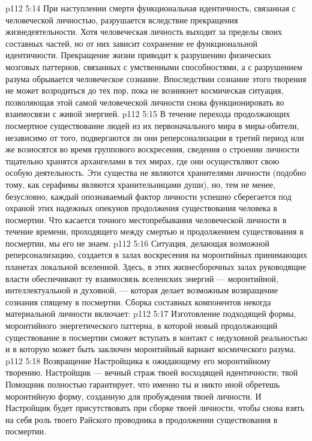 \vs p112 5:14 При наступлении смерти функциональная идентичность, связанная с человеческой личностью, разрушается вследствие прекращения жизнедеятельности. Хотя человеческая личность выходит за пределы своих составных частей, но от них зависит сохранение ее функциональной идентичности. Прекращение жизни приводит к разрушению физических мозговых паттернов, связанных с умственными способностями, а с разрушением разума обрывается человеческое сознание. Впоследствии сознание этого творения не может возродиться до тех пор, пока не возникнет космическая ситуация, позволяющая этой самой человеческой личности снова функционировать во взаимосвязи с живой энергией.
\vs p112 5:15 \pc В течение перехода продолжающих посмертное существование людей из их первоначального мира в миры\hyp{}обители, независимо от того, подвергаются ли они реперсонализации в третий период или же возносятся во время группового воскресения, сведения о строении личности тщательно хранятся архангелами в тех мирах, где они осуществляют свою особую деятельность. Эти существа не являются хранителями личности (подобно тому, как серафимы являются хранительницами души), но, тем не менее, безусловно, каждый опознаваемый фактор личности успешно сберегается под охраной этих надежных опекунов продолжения существования человека в посмертии. Что касается точного местопребывания человеческой личности в течение времени, проходящего между смертью и продолжением существования в посмертии, мы его не знаем.
\vs p112 5:16 \pc Ситуация, делающая возможной реперсонализацию, создается в залах воскресения на моронтийных принимающих планетах локальной вселенной. Здесь, в этих жизнесборочных залах руководящие власти обеспечивают ту взаимосвязь вселенских энергий --- моронтийной, интеллектуальной и духовной, --- которая делает возможным возвращение сознания спящему в посмертии. Сборка составных компонентов некогда материальной личности включает:
\vs p112 5:17 \bibnobreakspace Изготовление подходящей формы, моронтийного энергетического паттерна, в которой новый продолжающий существование в посмертии сможет вступать в контакт с недуховной реальностью и в которую может быть заключен моронтийный вариант космического разума.
\vs p112 5:18 \pc {}\bibnobreakspace Возвращение Настройщика к ожидающему его моронтийному творению. Настройщик --- вечный страж твоей восходящей идентичности; твой Помощник полностью гарантирует, что именно ты и никто иной обретешь моронтийную форму, созданную для пробуждения твоей личности. И Настройщик будет присутствовать при сборке твоей личности, чтобы снова взять на себя роль твоего Райского проводника в продолжении существования в посмертии.

